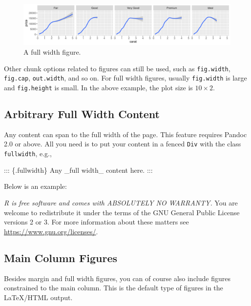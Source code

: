 \documentclass[]{tufte-handout}
\newenvironment{Shaded}{}{}
\newcommand{\NormalTok}[1]{#1}
\begin{document}
\begin{figure}
\includegraphics{tufte_files/figure-latex/fig-fullwidth-1} \caption[A full width figure]{A full width figure.}\label{fig:fig-fullwidth}
\end{figure}

Other chunk options related to figures can still be used, such as
\texttt{fig.width}, \texttt{fig.cap}, \texttt{out.width}, and so on. For
full width figures, usually \texttt{fig.width} is large and
\texttt{fig.height} is small. In the above example, the plot size is
\(10 \times 2\).

\hypertarget{arbitrary-full-width-content}{%
\subsection{Arbitrary Full Width
Content}\label{arbitrary-full-width-content}}

Any content can span to the full width of the page. This feature
requires Pandoc 2.0 or above. All you need is to put your content in a
fenced \texttt{Div} with the class \texttt{fullwidth}, e.g.,

\begin{Shaded}
\begin{Highlighting}[]
\NormalTok{::: \{.fullwidth\}}
\NormalTok{Any \_full width\_ content here.}
\NormalTok{:::}
\end{Highlighting}
\end{Shaded}

Below is an example:

\emph{R is free software and comes with ABSOLUTELY NO WARRANTY.} You are
welcome to redistribute it under the terms of the GNU General Public
License versions 2 or 3. For more information about these matters see
\url{https://www.gnu.org/licenses/}.

\hypertarget{main-column-figures}{%
\subsection{Main Column Figures}\label{main-column-figures}}

Besides margin and full width figures, you can of course also include
figures constrained to the main column. This is the default type of
figures in the LaTeX/HTML output.
\end{document}
